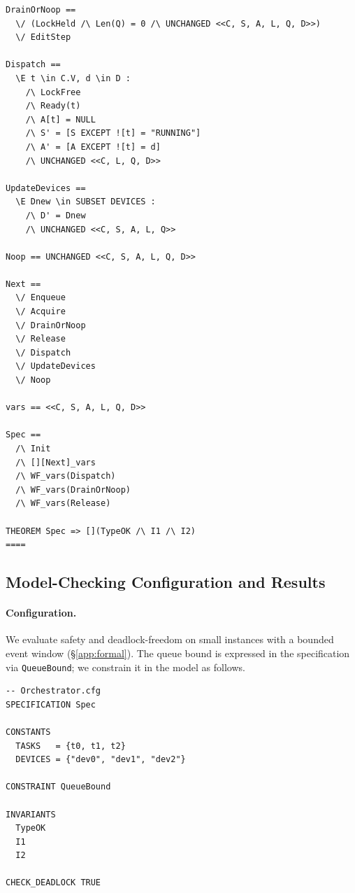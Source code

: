 \documentclass[10pt]{article} %
\begin{document}
\begin{lstlisting}[language={},basicstyle=\ttfamily\small,frame=single]
DrainOrNoop ==
  \/ (LockHeld /\ Len(Q) = 0 /\ UNCHANGED <<C, S, A, L, Q, D>>)
  \/ EditStep

Dispatch ==
  \E t \in C.V, d \in D :
    /\ LockFree
    /\ Ready(t)
    /\ A[t] = NULL
    /\ S' = [S EXCEPT ![t] = "RUNNING"]
    /\ A' = [A EXCEPT ![t] = d]
    /\ UNCHANGED <<C, L, Q, D>>

UpdateDevices ==
  \E Dnew \in SUBSET DEVICES :
    /\ D' = Dnew
    /\ UNCHANGED <<C, S, A, L, Q>>

Noop == UNCHANGED <<C, S, A, L, Q, D>>

Next ==
  \/ Enqueue
  \/ Acquire
  \/ DrainOrNoop
  \/ Release
  \/ Dispatch
  \/ UpdateDevices
  \/ Noop

vars == <<C, S, A, L, Q, D>>

Spec ==
  /\ Init
  /\ [][Next]_vars
  /\ WF_vars(Dispatch)
  /\ WF_vars(DrainOrNoop)
  /\ WF_vars(Release)

THEOREM Spec => [](TypeOK /\ I1 /\ I2)
====
\end{lstlisting}

\subsection{Model-Checking Configuration and Results}
\label{app:mcfg}

\paragraph{Configuration.}
We evaluate safety and deadlock-freedom on small instances with a bounded event window (\S\ref{app:formal}). The queue bound is expressed in the specification via \texttt{QueueBound}; we constrain it in the model as follows.

\begin{lstlisting}[language={},basicstyle=\ttfamily\small,frame=single]
-- Orchestrator.cfg
SPECIFICATION Spec

CONSTANTS
  TASKS   = {t0, t1, t2}
  DEVICES = {"dev0", "dev1", "dev2"}

CONSTRAINT QueueBound

INVARIANTS
  TypeOK
  I1
  I2

CHECK_DEADLOCK TRUE
\end{lstlisting}
\end{document}

